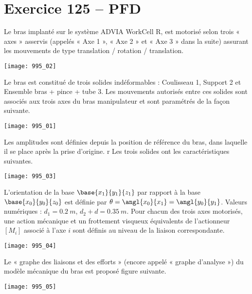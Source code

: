 \section*{Exercice 125 -- PFD}
\setcounter{exo}{0}

Le bras implanté sur le système ADVIA WorkCell R, est motorisé selon trois « axes » asservis (appelés « Axe 1 », « Axe 2 » et « Axe 3 » dans la suite) assurant les mouvements de type translation / rotation / translation.

\begin{center}
\texttt{[image: 995\_02]}
\end{center}


Le bras est constitué de trois solides indéformables : Coulisseau 1, Support 2 et Ensemble bras + pince +
tube 3. Les mouvements autorisés entre ces solides sont associés aux trois axes du bras manipulateur et sont
paramétrés de la façon suivante.

\begin{center}
\texttt{[image: 995\_01]}
\end{center}


Les amplitudes sont définies depuis la position de référence du bras, dans laquelle il se place après la prise
d’origine.
r
Les trois solides ont les caractéristiques suivantes.

\begin{center}
\texttt{[image: 995\_03]}
\end{center}

L’orientation de la base $\base{x_1}{y_1}{z_1}$ par rapport à la base $\base{x_0}{y_0}{z_0}$ est définie par $\theta  = \angl{x_0}{x_1} = \angl{y_0}{y_1}$.
Valeurs numériques : $d_1 = \SI{0,2}{m}$, $d_2 + d = \SI{0,35}{m}$.
Pour chacun des trois axes motorisés, une action mécanique et un frottement visqueux équivalents de l’actionneur
$\left[ M_i \right]$ associé à l’axe $i$ sont définis au niveau de la liaison correspondante.


\begin{center}
\texttt{[image: 995\_04]}
\end{center}

Le « graphe des liaisons et des efforts » (encore appelé « graphe d’analyse ») du modèle mécanique du bras est
proposé figure suivante.


\begin{center}
\texttt{[image: 995\_05]}
\end{center}


